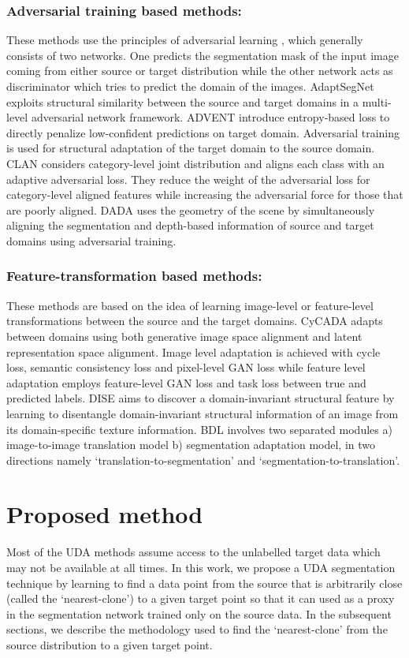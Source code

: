 \documentclass[runningheads]{llncs}
\begin{document}
\subsubsection{Adversarial training based methods:}
These methods use the principles of adversarial learning \cite{hoffman2016fcns}, which generally consists of two networks. One predicts the segmentation mask of the input image coming from either source or target distribution while the other network acts as discriminator which tries to predict the domain of the images.
AdaptSegNet \cite{tsai2018learning} exploits structural similarity between the source and target domains in a multi-level adversarial network  framework. 
ADVENT \cite{vu2018advent} introduce entropy-based loss to directly penalize low-confident predictions on target domain. Adversarial training is used for structural adaptation of the target domain to the source domain.
CLAN \cite{luo2019taking}  considers category-level joint distribution and aligns each class with an adaptive adversarial loss. They reduce the weight of the adversarial loss for category-level aligned features while increasing the adversarial force for those that are poorly aligned. DADA \cite{vu2019dada} uses the geometry of the scene by simultaneously aligning the segmentation and depth-based information of source and target domains using adversarial training.
\subsubsection{Feature-transformation based methods:}
These methods are based on the idea of learning image-level or feature-level transformations between the source and the target domains. CyCADA \cite{Hoffman_cycada2017} adapts between domains using
both generative image space alignment and latent
representation space alignment. Image level adaptation is achieved with cycle loss, semantic consistency loss and pixel-level GAN loss while feature level adaptation employs feature-level GAN loss and task loss between true and predicted labels.
DISE \cite{chang2019all} aims to discover a domain-invariant structural feature by learning to  disentangle domain-invariant structural information of an image from its domain-specific texture information.
BDL \cite{li2019bidirectional}  involves  two  separated  modules a) image-to-image translation model b) segmentation adaptation  model, in two directions namely `translation-to-segmentation' and `segmentation-to-translation'. 
\section{Proposed method}
Most of the UDA methods assume access to the unlabelled target data which may not be available at all times. In this work, we propose a UDA segmentation technique by learning to find a data point from the source that is arbitrarily close (called the `nearest-clone') to a given target point so that it can used as a proxy in the segmentation network trained only on the source data. In the subsequent sections, we describe the methodology used to find the `nearest-clone' from the source distribution to a given target point. 
\end{document}
